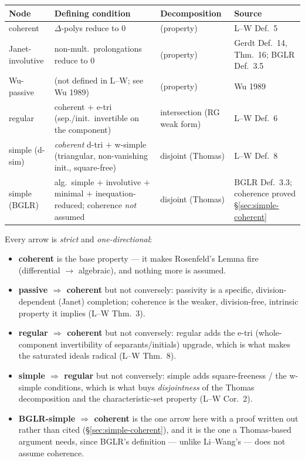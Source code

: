 \documentclass[11pt]{article}
\begin{document}
\begin{center}
\begin{tabular}{@{}p{2.3cm}p{5.6cm}p{3.0cm}p{2.7cm}@{}}
\toprule
Node & Defining condition & Decomposition & Source \\
\midrule
coherent & $\Delta$-polys reduce to $0$ & (property) & L--W Def.~5 \\
Janet-involutive & non-mult.\ prolongations reduce to $0$ & (property) & Gerdt Def.~14, Thm.~16; BGLR Def.~3.5 \\
Wu-passive & (not defined in L--W; see Wu 1989) & (property) & Wu 1989 \\
regular & coherent $+$ e-tri (sep./init.\ invertible on the component) & intersection (RG weak form) & L--W Def.~6 \\
simple (d-sim) & \emph{coherent} d-tri $+$ w-simple (triangular, non-vanishing init., square-free) & disjoint (Thomas) & L--W Def.~8 \\
simple (BGLR) & alg.\ simple $+$ involutive $+$ minimal $+$ inequation-reduced; coherence \emph{not} assumed & disjoint (Thomas) & BGLR Def.~3.3; coherence proved \S\ref{sec:simple-coherent} \\
\bottomrule
\end{tabular}
\end{center}

\noindent
Every arrow is \emph{strict} and \emph{one-directional}:
\begin{itemize}
  \item \textbf{coherent} is the base property --- it makes Rosenfeld's Lemma
        fire (differential $\to$ algebraic), and nothing more is assumed.
  \item \textbf{passive $\Rightarrow$ coherent} but not conversely: passivity is
        a specific, division-dependent (Janet) completion; coherence is the
        weaker, division-free, intrinsic property it implies (L--W Thm.~3).
  \item \textbf{regular $\Rightarrow$ coherent} but not conversely: regular adds
        the e-tri (whole-component invertibility of separants/initials) upgrade,
        which is what makes the saturated ideals radical (L--W Thm.~8).
  \item \textbf{simple $\Rightarrow$ regular} but not conversely: simple adds
        square-freeness / the w-simple conditions, which is what buys
        \emph{disjointness} of the Thomas decomposition and the characteristic-set
        property (L--W Cor.~2).
  \item \textbf{BGLR-simple $\Rightarrow$ coherent} is the one arrow here with a
        proof written out rather than cited (\S\ref{sec:simple-coherent}), and
        it is the one a Thomas-based argument needs, since BGLR's definition ---
        unlike Li--Wang's --- does not assume coherence.
\end{itemize}
\end{document}
